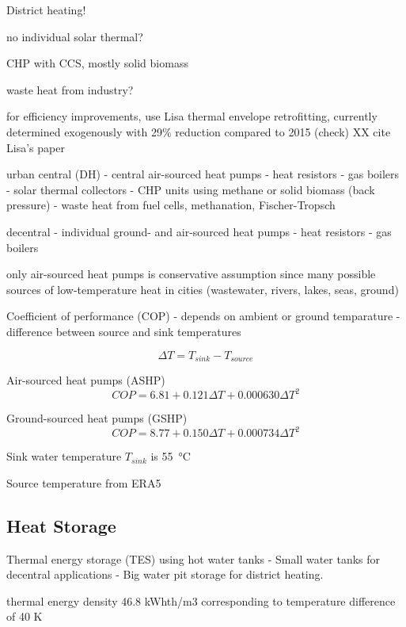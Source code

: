 District heating!

no individual solar thermal?

CHP with CCS, mostly solid biomass

waste heat from industry?

for efficiency improvements, use Lisa thermal envelope retrofitting, currently
determined exogenously with 29\% reduction compared to 2015 (check) XX cite
Lisa's paper 

urban central (DH)
- central air-sourced heat pumps
- heat resistors
- gas boilers
- solar thermal collectors
- CHP units using methane or solid biomass (back pressure)
- waste heat from fuel cells, methanation, Fischer-Tropsch

decentral
- individual ground- and air-sourced heat pumps
- heat resistors
- gas boilers

only air-sourced heat pumps is conservative assumption since many possible sources of
low-temperature heat in cities (wastewater, rivers, lakes, seas, ground)

Coefficient of performance (COP)
- depends on ambient or ground temparature
- difference between source and sink temperatures

\begin{equation}
    \Delta T = T_{sink} - T_{source}
\end{equation}

Air-sourced heat pumps (ASHP)
\begin{equation}
    COP = 6.81 + 0.121 \Delta T + 0.000630 \Delta T^2
\end{equation}

Ground-sourced heat pumps (GSHP)
\begin{equation}
    COP = 8.77 + 0.150 \Delta T + 0.000734 \Delta T^2
\end{equation}

Sink water temperature $T_{sink}$ is \SI{55}{\celsius}

Source temperature from ERA5

\subsection{Heat Storage}

Thermal energy storage (TES) using hot water tanks
- Small water tanks for decentral applications
- Big water pit storage for district heating.

thermal energy density 46.8 kWhth/m3 corresponding to temperature difference of 40 K

